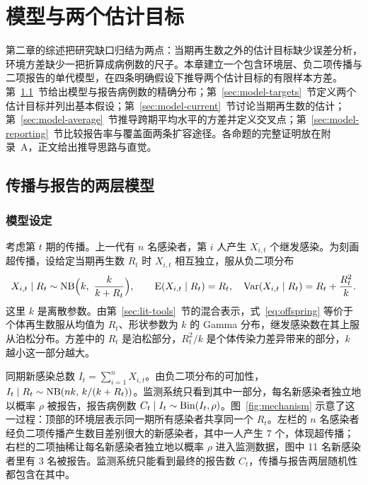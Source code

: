 \chapter{模型与两个估计目标}
\label{chap:model}

第二章的综述把研究缺口归结为两点：当期再生数之外的估计目标缺少误差分析，环境方差缺少一把折算成病例数的尺子。本章建立一个包含环境层、负二项传播与二项报告的单代模型，在四条明确假设下推导两个估计目标的有限样本方差。第~\ref{sec:model-setup}~节给出模型与报告病例数的精确分布；第~\ref{sec:model-targets}~节定义两个估计目标并列出基本假设；第~\ref{sec:model-current}~节讨论当期再生数的估计；第~\ref{sec:model-average}~节推导跨期平均水平的方差并定义交叉点；第~\ref{sec:model-reporting}~节比较报告率与覆盖面两条扩容途径。各命题的完整证明放在附录~A，正文给出推导思路与直觉。

\section{传播与报告的两层模型}
\label{sec:model-setup}

\subsection{模型设定}

考虑第 $t$ 期的传播。上一代有 $n$ 名感染者，第 $i$ 人产生 $X_{i,t}$ 个继发感染。为刻画超传播，设给定当期再生数 $R_t$ 时 $X_{i,t}$ 相互独立，服从负二项分布
\begin{equation}
  X_{i,t}\mid R_t \sim \operatorname{NB}\Bigl(k,\ \frac{k}{k+R_t}\Bigr),\qquad
  \operatorname{E}(X_{i,t}\mid R_t)=R_t,\quad \operatorname{Var}(X_{i,t}\mid R_t)=R_t+\frac{R_t^2}{k}.
  \label{eq:offspring}
\end{equation}
这里 $k$ 是离散参数。由第~\ref{sec:lit-tools}~节的混合表示，式~\eqref{eq:offspring} 等价于个体再生数服从均值为 $R_t$、形状参数为 $k$ 的 Gamma 分布，继发感染数在其上服从泊松分布\citep{lloydsmith2005superspreading}。方差中的 $R_t$ 是泊松部分，$R_t^2/k$ 是个体传染力差异带来的部分，$k$ 越小这一部分越大。

同期新感染总数 $I_t=\sum_{i=1}^{n}X_{i,t}$。由负二项分布的可加性，$I_t\mid R_t\sim\operatorname{NB}(nk,\,k/(k+R_t))$。监测系统只看到其中一部分，每名新感染者独立地以概率 $\rho$ 被报告，报告病例数 $C_t\mid I_t\sim\operatorname{Bin}(I_t,\rho)$。图~\ref{fig:mechanism} 示意了这一过程：顶部的环境层表示同一期所有感染者共享同一个 $R_t$。左栏的 $n$ 名感染者经负二项传播产生数目差别很大的新感染者，其中一人产生 7 个，体现超传播；右栏的二项抽稀让每名新感染者独立地以概率 $\rho$ 进入监测数据，图中 11 名新感染者里有 3 名被报告。监测系统只能看到最终的报告数 $C_t$，传播与报告两层随机性都包含在其中。

